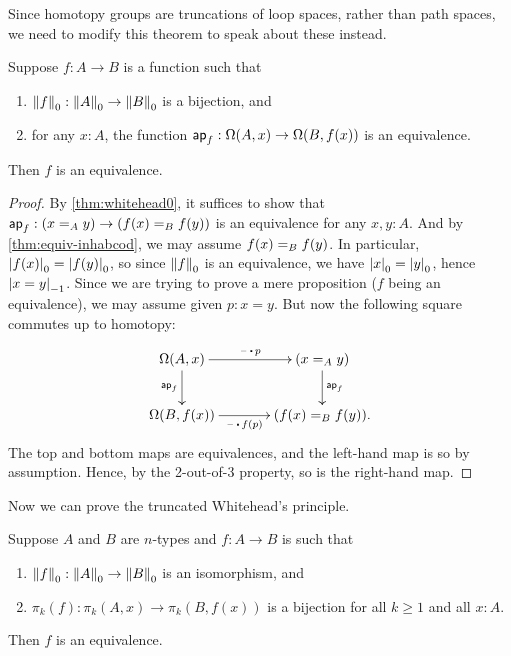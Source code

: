 Since homotopy groups are truncations of loop spaces, rather than path spaces, we need to modify this theorem to speak about these instead.

\begin{cor}\label{thm:whitehead1}
  Suppose $f:A\to B$ is a function such that
  \begin{enumerate}
  \item $\trunc0 f : \trunc0 A \to \trunc0 B$ is a bijection, and
  \item for any $x:A$, the function $\apfunc f : \Omega(A,x) \to \Omega(B,f(x))$ is an equivalence.
  \end{enumerate}
  Then $f$ is an equivalence.
\end{cor}
\begin{proof}
  By \autoref{thm:whitehead0}, it suffices to show that $\apfunc f : (\id[A]xy) \to (\id[B]{f(x)}{f(y)})$ is an equivalence for any $x,y:A$.
  And by \autoref{thm:equiv-inhabcod}, we may assume $\id[B]{f(x)}{f(y)}$.
  In particular, $\tproj0{f(x)} = \tproj0{f(y)}$, so since $\trunc0 f$ is an equivalence, we have $\tproj0 x = \tproj0y$, hence $\tproj{-1}{x=y}$.
  Since we are trying to prove a mere proposition ($f$ being an equivalence), we may assume given $p:x=y$.
  But now the following square commutes up to homotopy:
  \begin{equation*}
  \vcenter{\xymatrix@C=3pc{
      \Omega(A,x)\ar[r]^-{\blank\ct p}\ar[d]_{\apfunc f} &
      (\id[A]xy) \ar[d]^{\apfunc f}\\
      \Omega(B,f(x))\ar[r]_-{\blank\ct f(p)} &
      (\id[B]{f(x)}{f(y)}).
      }}
  \end{equation*}
  The top and bottom maps are equivalences, and the left-hand map is so by assumption.
  Hence, by the 2-out-of-3 property, so is the right-hand map.
\end{proof}

Now we can prove the truncated Whitehead's principle.

\begin{thm}\label{thm:whiteheadn}
  Suppose $A$ and $B$ are $n$-types and $f:A\to B$ is such that
  \begin{enumerate}
  \item $\trunc0f:\trunc0A \to \trunc0B$ is an isomorphism, and\label{item:wh0}
  \item $\pi_k(f):\pi_k(A,x) \to \pi_k(B,f(x))$ is a bijection for all $k\ge 1$ and all $x:A$.\label{item:whk}
  \end{enumerate}
  Then $f$ is an equivalence.
\end{thm}

